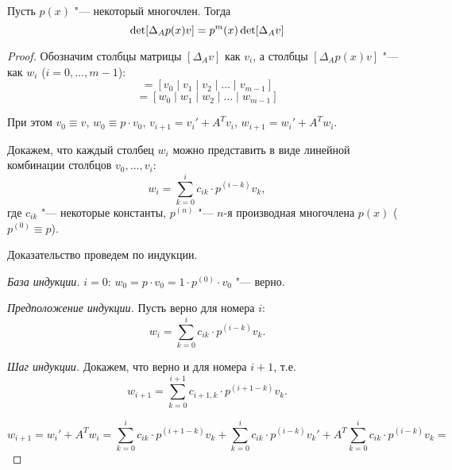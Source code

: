 \begin{proposition}
Пусть $p(x)$ "--- некоторый многочлен. Тогда
\begin{equation*}
    \mathop{\rm det}[\Delta_A p(x)v] = p^{m}(x)\mathop{\rm det}[\Delta_A v]
\end{equation*}
\end{proposition}

\begin{proof}

Обозначим столбцы матрицы $[\Delta_A v]$ как $v_i$, а столбцы $[\Delta_A p(x)v]$ "--- как $w_i$ ($i = 0, \dots, m - 1$):
\begin{equation*}
    [\Delta_A v] = [v_0 \mid v_1 \mid v_2 \mid \dots \mid v_{m-1}]
\end{equation*}
\begin{equation*}
    [\Delta_A p(x)v] = [w_0 \mid w_1 \mid w_2 \mid \dots \mid w_{m-1}]
\end{equation*}

При этом $v_0 \equiv v$, $w_0 \equiv p \cdot v_0$, $v_{i+1} = v_{i}' + A^T v_{i}$, $w_{i+1} = w_{i}' + A^T w_{i}$.

Докажем, что каждый столбец $w_i$ можно представить в виде
линейной комбинации столбцов $v_0, \dots, v_i$:
\begin{equation*}
    w_i = \sum\limits_{k = 0}^i c_{ik} \cdot p^{(i - k)} v_k,
\end{equation*}
где $c_{ik}$ "--- некоторые константы, $p^{(n)}$ "--- $n$-я производная многочлена $p(x)$ ($p^{(0)} \equiv p$).

Доказательство проведем по индукции.

\emph{База индукции.} $i = 0$: $w_0 = p \cdot v_0 = 1 \cdot p^{(0)} \cdot v_0$ "--- верно.

\emph{Предположение индукции.} Пусть верно для номера $i$:
\begin{equation*}
    w_i = \sum\limits_{k = 0}^i c_{ik} \cdot p^{(i - k)} v_k.
\end{equation*}

\emph{Шаг индукции.} Докажем, что верно и для номера $i + 1$, т.е.
\begin{equation*}
    w_{i+1} = \sum\limits_{k = 0}^{i+1} c_{i+1, k} \cdot p^{(i + 1 - k)} v_k.
\end{equation*}

\begin{equation*}
    w_{i+1} = w_{i}' + A^T w_{i} = \sum\limits_{k = 0}^i c_{ik} \cdot p^{(i + 1 - k)} v_k +
    \sum\limits_{k = 0}^i c_{ik} \cdot p^{(i - k)} v_k' + A^T \sum\limits_{k = 0}^i c_{ik} \cdot p^{(i - k)} v_k =
\end{equation*}


\end{proof}
